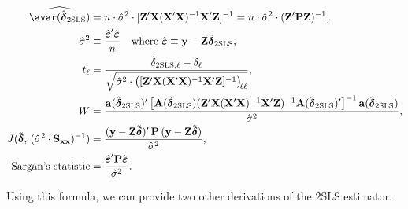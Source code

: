 \begin{align}
  \widehat{\avar(\hat{\boldsymbol{\delta}}_{\text{2SLS}})}
  &= n \cdot \hat{\sigma}^2 \cdot
     [\mathbf{Z}'\mathbf{X}(\mathbf{X}'\mathbf{X})^{-1}\mathbf{X}'\mathbf{Z}]^{-1}
  = n \cdot \hat{\sigma}^2 \cdot (\mathbf{Z}'\mathbf{P}\mathbf{Z})^{-1},
  \label{eq:3.8.5p} \\
  \hat{\sigma}^2 &\equiv \frac{\hat{\boldsymbol{\varepsilon}}'\hat{\boldsymbol{\varepsilon}}}{n}
  \quad \text{where } \hat{\boldsymbol{\varepsilon}} \equiv \mathbf{y}
  - \mathbf{Z}\hat{\boldsymbol{\delta}}_{\text{2SLS}},
  \label{eq:3.8.6p} \\
  t_\ell &= \frac{\hat{\delta}_{\text{2SLS},\ell} - \bar{\delta}_\ell}
    {\sqrt{\hat{\sigma}^2 \cdot
    \bigl([\mathbf{Z}'\mathbf{X}(\mathbf{X}'\mathbf{X})^{-1}\mathbf{X}'\mathbf{Z}]^{-1}
    \bigr)_{\!\ell\ell}}},
  \label{eq:3.8.7p} \\
  W &= \frac{\mathbf{a}(\hat{\boldsymbol{\delta}}_{\text{2SLS}})'\,
    \bigl[\mathbf{A}(\hat{\boldsymbol{\delta}}_{\text{2SLS}})
    (\mathbf{Z}'\mathbf{X}(\mathbf{X}'\mathbf{X})^{-1}\mathbf{X}'\mathbf{Z})^{-1}
    \mathbf{A}(\hat{\boldsymbol{\delta}}_{\text{2SLS}})'\bigr]^{-1}\,
    \mathbf{a}(\hat{\boldsymbol{\delta}}_{\text{2SLS}})}{\hat{\sigma}^2},
  \label{eq:3.8.8p} \\
  J(\tilde{\boldsymbol{\delta}},\, (\hat{\sigma}^2 \cdot \mathbf{S}_{\mathbf{xx}})^{-1})
  &= \frac{(\mathbf{y} - \mathbf{Z}\tilde{\boldsymbol{\delta}})'\,
     \mathbf{P}\,(\mathbf{y} - \mathbf{Z}\tilde{\boldsymbol{\delta}})}{\hat{\sigma}^2},
  \label{eq:3.8.9p} \\
  \text{Sargan's statistic}
  &= \frac{\hat{\boldsymbol{\varepsilon}}'\mathbf{P}\hat{\boldsymbol{\varepsilon}}}
     {\hat{\sigma}^2}.
  \label{eq:3.8.10p}
\end{align}

Using this formula, we can provide two other derivations of the 2SLS estimator.


